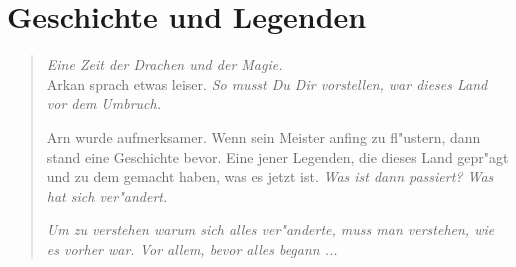 \chapter{Geschichte und Legenden}
\label{legendenundgeschichten}

\begin{quotation}
\par \textit{\glqq Eine Zeit der Drachen und der Magie.\grqq}\\
Arkan sprach etwas leiser. \textit{\glqq So musst Du Dir vorstellen, war dieses Land vor dem Umbruch.\grqq}
\par Arn wurde aufmerksamer. Wenn sein Meister anfing zu fl"ustern, dann stand eine Geschichte bevor. Eine jener Legenden, die dieses Land gepr"agt und zu dem gemacht haben, was es jetzt ist. \textit{\glqq Was ist dann passiert? Was hat sich ver"andert.\grqq}
\par \textit{\glqq Um zu verstehen warum sich alles ver"anderte, muss man verstehen, wie es vorher war. Vor allem, bevor alles begann ... \grqq}
\end{quotation}


	
	
	
	
	

